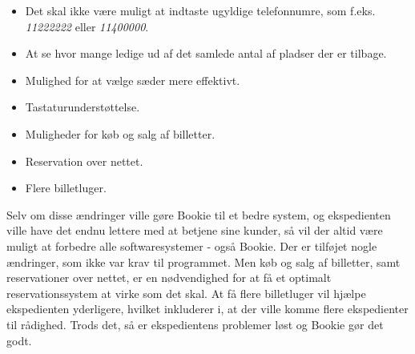 \begin{itemize}
  \item Det skal ikke være muligt at indtaste ugyldige telefonnumre, som f.eks. \textit{
  11222222} eller \textit{11400000}.
  \item At se hvor mange ledige ud af det samlede antal af pladser der er tilbage.
  \item Mulighed for at vælge sæder mere effektivt.
  
  \item Tastaturunderstøttelse.
  
  \item Muligheder for køb og salg af billetter.
  
  \item Reservation over nettet.
  
  \item Flere billetluger.
  
\end{itemize}
Selv om disse ændringer ville gøre Bookie til et bedre system, og ekspedienten ville have det endnu lettere med at betjene sine kunder, så vil der altid være muligt at forbedre alle softwaresystemer - også Bookie. Der er tilføjet nogle ændringer, som ikke var krav til programmet. Men køb og salg af billetter, samt reservationer over nettet, er en nødvendighed for at få et optimalt reservationssystem at virke som det skal. At få flere billetluger vil hjælpe ekspedienten yderligere, hvilket inkluderer i, at der ville komme flere ekspedienter til rådighed.
Trods det, så er ekspedientens problemer løst og Bookie gør det godt.





